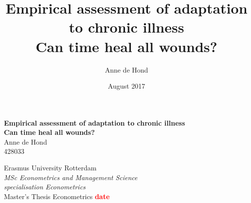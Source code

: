 \documentclass[12pt]{article}
\title{\large{Empirical assessment of adaptation to chronic illness} \\{Can time heal all wounds?}}
\author{Anne de Hond }
\date{August 2017}
\begin{document}
\begin{titlingpage}
    \begin{center}
        \vspace*{1cm}
        
        \textbf{\huge Empirical assessment of adaptation to chronic illness}\\
        \vspace{0.5cm}
        \textbf{\Large Can time heal all wounds?}\\
        \vspace{2cm}
        \Large{Anne de Hond   \\
        428033}      
     \end{center}   
        
                
        \vspace{10cm}
        
        {\normalsize \noindent Erasmus University Rotterdam}\\
        {\textit{\small MSc Econometrics and Management Science\\
        \indent specialisation Econometrics}}\\
        {\small Master's Thesis Econometrics \quad\quad\quad\quad\quad\quad\quad\quad\quad\quad\quad\quad\quad\quad\quad\quad\quad\quad\quad\quad\quad\quad\quad \textbf{\textcolor{red}{date}}}\\


\end{titlingpage}
\end{document}
